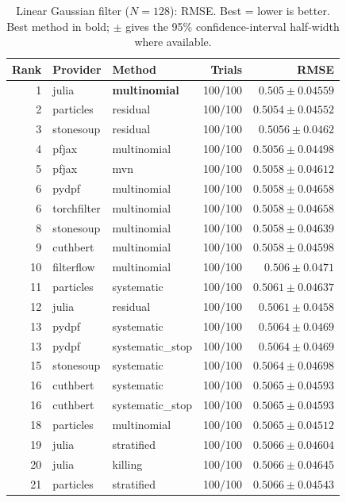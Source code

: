 \begin{table}[!htbp]
\centering
\small
\caption{Linear Gaussian filter ($N=128$): RMSE. Best = lower is better. Best method in bold; $\pm$ gives the 95\% confidence-interval half-width where available.}
\label{tab:linear-gaussian-filter-rmse}
\begin{tabular}{rllrr}
\toprule
Rank & Provider & Method & Trials & RMSE \\
\midrule
1 & julia & \textbf{multinomial} & 100/100 & $\mathbf{0.505 \pm 0.04559}$ \\
2 & particles & residual & 100/100 & $0.5054 \pm 0.04552$ \\
3 & stonesoup & residual & 100/100 & $0.5056 \pm 0.0462$ \\
4 & pfjax & multinomial & 100/100 & $0.5056 \pm 0.04498$ \\
5 & pfjax & mvn & 100/100 & $0.5058 \pm 0.04612$ \\
6 & pydpf & multinomial & 100/100 & $0.5058 \pm 0.04658$ \\
6 & torchfilter & multinomial & 100/100 & $0.5058 \pm 0.04658$ \\
8 & stonesoup & multinomial & 100/100 & $0.5058 \pm 0.04639$ \\
9 & cuthbert & multinomial & 100/100 & $0.5058 \pm 0.04598$ \\
10 & filterflow & multinomial & 100/100 & $0.506 \pm 0.0471$ \\
11 & particles & systematic & 100/100 & $0.5061 \pm 0.04637$ \\
12 & julia & residual & 100/100 & $0.5061 \pm 0.0458$ \\
13 & pydpf & systematic & 100/100 & $0.5064 \pm 0.0469$ \\
13 & pydpf & systematic\_stop & 100/100 & $0.5064 \pm 0.0469$ \\
15 & stonesoup & systematic & 100/100 & $0.5064 \pm 0.04698$ \\
16 & cuthbert & systematic & 100/100 & $0.5065 \pm 0.04593$ \\
16 & cuthbert & systematic\_stop & 100/100 & $0.5065 \pm 0.04593$ \\
18 & particles & multinomial & 100/100 & $0.5065 \pm 0.04512$ \\
19 & julia & stratified & 100/100 & $0.5066 \pm 0.04604$ \\
20 & julia & killing & 100/100 & $0.5066 \pm 0.04645$ \\
21 & particles & stratified & 100/100 & $0.5066 \pm 0.04543$ \\

\end{tabular}
\end{table}
